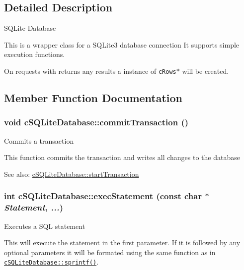 \subsection{Detailed Description}
SQLite Database

This is a wrapper class for a SQLite3 database connection It supports simple execution functions.

On requests with returns any results a instance of {\tt cRows$\ast$} will be created. 

\subsection{Member Function Documentation}
\hypertarget{classcSQLiteDatabase_f11b7090ae824f7f3fc094dc7112323a}{
\subsubsection[{commitTransaction}]{\setlength{\rightskip}{0pt plus 5cm}void cSQLiteDatabase::commitTransaction ()}}
\label{classcSQLiteDatabase_f11b7090ae824f7f3fc094dc7112323a}


Commits a transaction

This function commits the transaction and writes all changes to the database

\begin{Desc}
\item[See also:]\hyperlink{classcSQLiteDatabase_5c481c06d73cff4f1192409bfc23a15a}{cSQLiteDatabase::startTransaction} \end{Desc}
\hypertarget{classcSQLiteDatabase_33ac864ee86fe3f08f66f1c14fcfc331}{
\subsubsection[{execStatement}]{\setlength{\rightskip}{0pt plus 5cm}int cSQLiteDatabase::execStatement (const char $\ast$ {\em Statement}, \/   {\em ...})}}
\label{classcSQLiteDatabase_33ac864ee86fe3f08f66f1c14fcfc331}


Executes a SQL statement

This will execute the statement in the first parameter. If it is followed by any optional parameters it will be formated using the same function as in {\tt \hyperlink{classcSQLiteDatabase_cdc42326657aea81fd26da6500642381}{cSQLiteDatabase::sprintf()}}.

